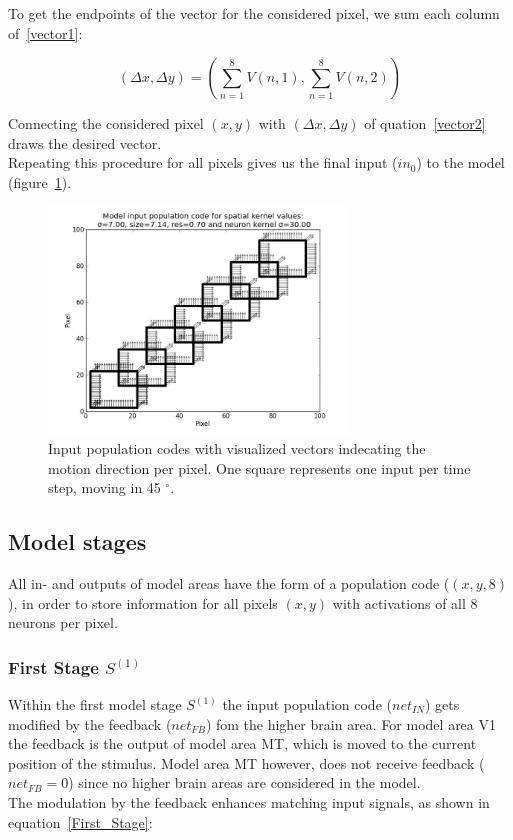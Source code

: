 \documentclass[a4paper]{article}
\begin{document}
To get the endpoints of the vector for the considered pixel, we sum each column of~\eqref{vector1}:

\begin{equation}
(\Delta x, \Delta y)=(\sum_{n=1}^{8}V(n,1),\sum_{n=1}^{8}V(n,2))
\label{vector2}
\end{equation}

Connecting the considered pixel $(x,y)$ with $(\Delta x, \Delta y)$ of quation~\eqref{vector2} draws the desired vector.\\
Repeating this procedure for all pixels gives us the final input ($in_{0}$) to the model (figure~\ref{fig:input}).

\vspace{0.5cm}
\begin{figure}[ht]
\centering
\includegraphics[width=8cm]{pics/input}
\caption{Input population codes with visualized vectors indecating the motion direction per pixel. One square represents one input per time step, moving in 45 $^{\circ}$.}
\label{fig:input}
\end{figure}
\vspace{0.5cm}

\subsection{Model stages}
All in- and outputs of model areas have the form of a population code ($(x,y,8)$), in order to store information for all pixels $(x,y)$ with activations of all 8 neurons per pixel.\\

\subsubsection{First Stage $S^{(1)}$}
Within the first model stage $S^{(1)}$ the input population code ($net_{IN}$) gets modified by the feedback ($net_{FB}$) fom the higher brain area. For model area V1 the feedback is the output of model area MT, which is moved to the current position of the stimulus. Model area MT however, does not receive feedback ($net_{FB}=0$) since no higher brain areas are considered in the model.\\
The modulation by the feedback enhances matching input signals, as shown in equation~\eqref{First_Stage}:
\end{document}
